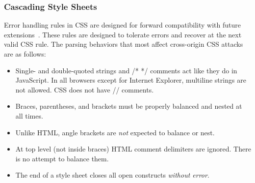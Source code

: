 \documentclass{acm_proc_article-sp}
\begin{document}
% 

\subsubsection{Cascading Style Sheets}
Error handling rules in CSS are designed for forward compatibility
with future extensions~\cite{syndata}. These rules are designed to tolerate errors and recover at the next valid CSS rule. The parsing behaviors that most affect cross-origin CSS attacks are as follows:

\begin{itemize}
\item Single- and double-quoted strings and /* */ comments act like they
do in JavaScript. In all browsers except for Internet Explorer, multiline strings are not allowed. CSS does not have // comments.
\item Braces, parentheses, and brackets must be properly balanced and nested at all times. 
\item Unlike HTML, angle brackets are {\em not} expected to balance or nest. 
\item At top level (not inside braces) HTML comment delimiters are ignored.
There is no attempt to balance them.
\item The end of a style sheet closes all open constructs {\em without error}.  \end{itemize}

\end{document}
